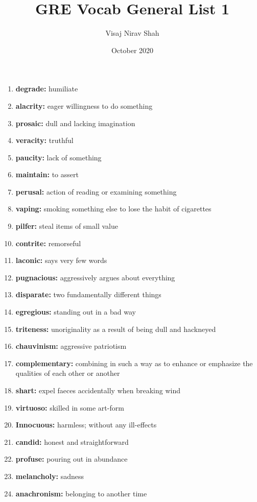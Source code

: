 \documentclass{article}
\title{\textbf{GRE Vocab General List 1}}
\author{Visaj Nirav Shah}
\date{October 2020}
\begin{document}
\maketitle

\begin{enumerate}
    \item \textbf{degrade: }{humiliate}
    \item \textbf{alacrity: }{eager willingness to do something}
    \item \textbf{prosaic: }{dull and lacking imagination}
    \item \textbf{veracity: }{truthful}
    \item \textbf{paucity: }{lack of something}
    \item \textbf{maintain: }{to assert}
    \item \textbf{perusal: }{action of reading or examining something}
    \item \textbf{vaping: }{smoking something else to lose the habit of cigarettes}
    \item \textbf{pilfer: }{steal items of small value}
    \item \textbf{contrite: }{remorseful}
    \item \textbf{laconic: }{says very few words}
    \item \textbf{pugnacious: }{aggressively argues about everything}
    \item \textbf{disparate: }{two fundamentally different things}
    \item \textbf{egregious: }{standing out in a bad way}
    \item \textbf{triteness: }{unoriginality as a result of being dull and hackneyed}
    \item \textbf{chauvinism: }{aggressive patriotism}
    \item \textbf{complementary: }{combining in such a way as to enhance or emphasize the qualities of each other or another}
    \item \textbf{shart: }{expel faeces accidentally when breaking wind}
    \item \textbf{virtuoso: }{skilled in some art-form}
    \item \textbf{Innocuous: }{harmless; without any ill-effects}
    \item \textbf{candid: }{honest and straightforward}
    \item \textbf{profuse: }{pouring out in abundance}
    \item \textbf{melancholy: }{sadness}
    \item \textbf{anachronism: }{belonging to another time}

\end{enumerate}
\end{document}
